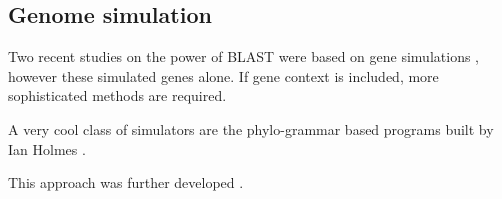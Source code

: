 \subsection{Genome simulation}

  Two recent studies on the power of BLAST were based on gene simulations
  \cite{moyers_phylostratigraphic_2015,moyers_evaluating_2016}, however these
  simulated genes alone. If gene context is included, more sophisticated
  methods are required.

  A very cool class of simulators are the phylo-grammar based programs built by
  Ian Holmes \cite{klosterman_xrate:_2006}. 

  This approach was further developed \cite{westesson_developing_2012}.
